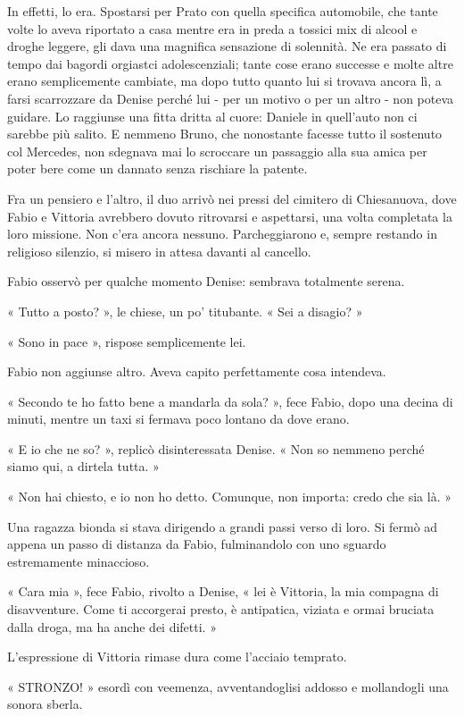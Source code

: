 In effetti, lo era. Spostarsi per Prato con quella specifica automobile, che tante volte lo aveva riportato a casa mentre era in preda a tossici mix di alcool e droghe leggere, gli dava una magnifica sensazione di solennità. Ne era passato di tempo dai bagordi orgiastci adolescenziali; tante cose erano successe e molte altre erano semplicemente cambiate, ma dopo tutto quanto lui si trovava ancora lì, a farsi scarrozzare da Denise perché lui - per un motivo o per un altro - non poteva guidare. Lo raggiunse una fitta dritta al cuore: Daniele in quell'auto non ci sarebbe più salito. E nemmeno Bruno, che nonostante facesse tutto il sostenuto col Mercedes, non sdegnava mai lo scroccare un passaggio alla sua amica per poter bere come un dannato senza rischiare la patente.

Fra un pensiero e l'altro, il duo arrivò nei pressi del cimitero di Chiesanuova, dove Fabio e Vittoria avrebbero dovuto ritrovarsi e aspettarsi, una volta completata la loro missione. Non c'era ancora nessuno. Parcheggiarono e, sempre restando in religioso silenzio, si misero in attesa davanti al cancello.

Fabio osservò per qualche momento Denise: sembrava totalmente serena.

« Tutto a posto? », le chiese, un po' titubante. « Sei a disagio? »

« Sono in pace », rispose semplicemente lei.

Fabio non aggiunse altro. Aveva capito perfettamente cosa intendeva.

« Secondo te ho fatto bene a mandarla da sola? », fece Fabio, dopo una decina di minuti, mentre un taxi si fermava poco lontano da dove erano.

« E io che ne so? », replicò disinteressata Denise. « Non so nemmeno perché siamo qui, a dirtela tutta. »

« Non hai chiesto, e io non ho detto. Comunque, non importa: credo che sia là. »

Una ragazza bionda si stava dirigendo a grandi passi verso di loro. Si fermò ad appena un passo di distanza da Fabio, fulminandolo con uno sguardo estremamente minaccioso.

« Cara mia », fece Fabio, rivolto a Denise, « lei è Vittoria, la mia compagna di disavventure. Come ti accorgerai presto, è antipatica, viziata e ormai bruciata dalla droga, ma ha anche dei difetti. »

L'espressione di Vittoria rimase dura come l'acciaio temprato.

« STRONZO! » esordì con veemenza, avventandoglisi addosso e mollandogli una sonora sberla.

